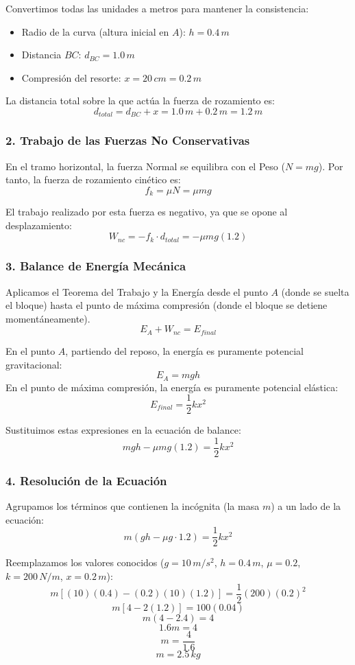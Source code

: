 \documentclass[12pt, a4paper]{article}
\begin{document}
Convertimos todas las unidades a metros para mantener la consistencia:
\begin{itemize}
    \item Radio de la curva (altura inicial en $A$): $h = 0.4 \, \si{m}$
    \item Distancia $BC$: $d_{BC} = 1.0 \, \si{m}$
    \item Compresión del resorte: $x = 20 \, \si{cm} = 0.2 \, \si{m}$
\end{itemize}

La distancia total sobre la que actúa la fuerza de rozamiento es:
$$ d_{total} = d_{BC} + x = 1.0 \, \si{m} + 0.2 \, \si{m} = 1.2 \, \si{m} $$

\subsubsection*{2. Trabajo de las Fuerzas No Conservativas}
En el tramo horizontal, la fuerza Normal se equilibra con el Peso ($N = mg$). Por tanto, la fuerza de rozamiento cinético es:
$$ f_k = \mu N = \mu mg $$

El trabajo realizado por esta fuerza es negativo, ya que se opone al desplazamiento:
$$ W_{nc} = -f_k \cdot d_{total} = -\mu mg (1.2) $$

\subsubsection*{3. Balance de Energía Mecánica}
Aplicamos el Teorema del Trabajo y la Energía desde el punto $A$ (donde se suelta el bloque) hasta el punto de máxima compresión (donde el bloque se detiene momentáneamente).
$$ E_A + W_{nc} = E_{final} $$

En el punto $A$, partiendo del reposo, la energía es puramente potencial gravitacional:
$$ E_A = mgh $$
En el punto de máxima compresión, la energía es puramente potencial elástica:
$$ E_{final} = \frac{1}{2} k x^2 $$

Sustituimos estas expresiones en la ecuación de balance:
$$ mgh - \mu mg (1.2) = \frac{1}{2} k x^2 $$

\subsubsection*{4. Resolución de la Ecuación}
Agrupamos los términos que contienen la incógnita (la masa $m$) a un lado de la ecuación:
$$ m (gh - \mu g \cdot 1.2) = \frac{1}{2} k x^2 $$

Reemplazamos los valores conocidos ($g = 10 \, \si{m/s^2}$, $h = 0.4 \, \si{m}$, $\mu = 0.2$, $k = 200 \, \si{N/m}$, $x = 0.2 \, \si{m}$):
$$ m \left[ (10)(0.4) - (0.2)(10)(1.2) \right] = \frac{1}{2} (200) (0.2)^2 $$
$$ m \left[ 4 - 2(1.2) \right] = 100 (0.04) $$
$$ m (4 - 2.4) = 4 $$
$$ 1.6 m = 4 $$
$$ m = \frac{4}{1.6} $$
$$ m = 2.5 \, \si{kg} $$
\end{document}
